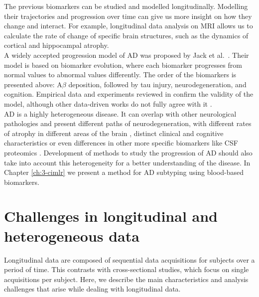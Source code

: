 The previous biomarkers can be studied and modelled longitudinally. Modelling their trajectories and progression over time can give us more insight on how they change and interact. For example, longitudinal data analysis on MRI allows us to calculate the rate of change of specific brain structures, such as the dynamics of cortical and hippocampal atrophy. \\

A widely accepted progression model of AD was proposed by Jack et al.\ \cite{Jack2010}. Their model is based on biomarker evolution, where each biomarker progresses from normal values to abnormal values differently. The order of the biomarkers is presented above: A$\beta$ deposition, followed by tau injury, neurodegeneration, and cognition. Empirical data and experiments reviewed in \cite{Jack2013} confirm the validity of the model, although other data-driven works do not fully agree with it \cite{Iturria-Medina2016}. \\

AD is a highly heterogeneous disease. It can overlap with other neurological pathologies and present different paths of neurodegeneration, with different rates of atrophy in different areas of the brain \cite{Lam2013,Poulakis2018}, distinct clinical and cognitive characteristics \cite{Murray2011} or even differences in other more specific biomarkers like CSF proteomics \cite{Tijms2020}. Development of methods to study the progression of AD should also take into account this heterogeneity for a better understanding of the disease. In Chapter \ref{ch:3-cimlr} we present a method for AD subtyping using blood-based biomarkers. \\

\section{Challenges in longitudinal and heterogeneous data}

Longitudinal data are composed of sequential data acquisitions for subjects over a period of time. This contrasts with cross-sectional studies, which focus on single acquisitions per subject. Here, we describe the main characteristics and analysis challenges that arise while dealing with longitudinal data. \\

